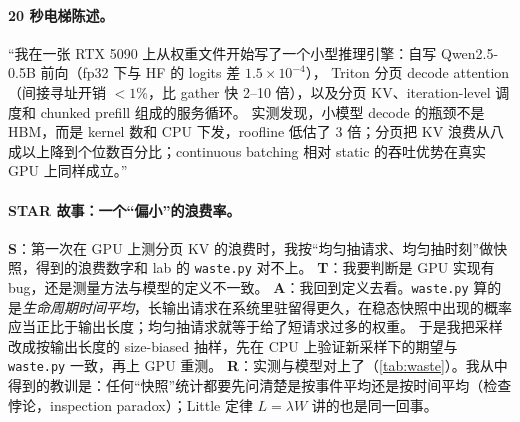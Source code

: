 \documentclass[11pt,a4paper]{ctexart}
\begin{document}
\paragraph{20 秒电梯陈述。}
“我在一张 RTX 5090 上从权重文件开始写了一个小型推理引擎：自写 Qwen2.5-0.5B 前向（fp32 下与 HF 的 logits 差 $1.5\times10^{-4}$），
Triton 分页 decode attention（间接寻址开销 $<1\%$，比 gather 快 2--10 倍），以及分页 KV、iteration-level 调度和 chunked prefill 组成的服务循环。
实测发现，小模型 decode 的瓶颈不是 HBM，而是 kernel 数和 CPU 下发，roofline 低估了 3 倍；分页把 KV 浪费从八成以上降到个位数百分比；continuous batching 相对 static 的吞吐优势在真实 GPU 上同样成立。”

\paragraph{STAR 故事：一个“偏小”的浪费率。}
\textbf{S}：第一次在 GPU 上测分页 KV 的浪费时，我按“均匀抽请求、均匀抽时刻”做快照，得到的浪费数字和 lab 的 \texttt{waste.py} 对不上。
\textbf{T}：我要判断是 GPU 实现有 bug，还是测量方法与模型的定义不一致。
\textbf{A}：我回到定义去看。\texttt{waste.py} 算的是\emph{生命周期时间平均}，长输出请求在系统里驻留得更久，在稳态快照中出现的概率应当正比于输出长度；均匀抽请求就等于给了短请求过多的权重。
于是我把采样改成按输出长度的 size-biased 抽样，先在 CPU 上验证新采样下的期望与 \texttt{waste.py} 一致，再上 GPU 重测。
\textbf{R}：实测与模型对上了（\cref{tab:waste}）。我从中得到的教训是：任何“快照”统计都要先问清楚是按事件平均还是按时间平均（检查悖论，inspection paradox）；Little 定律 $L=\lambda W$ 讲的也是同一回事。

\end{document}
